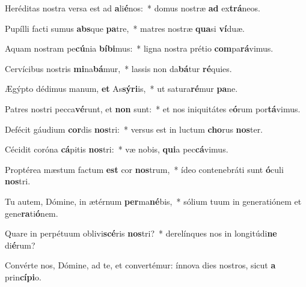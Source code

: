 \item Heréditas nostra versa est ad \textbf{a}li\textbf{é}nos:~* domus nostræ \textbf{ad} ex\textbf{trá}neos.
\item Pupílli facti sumus \textbf{abs}que \textbf{pa}tre,~* matres nostræ \textbf{qua}si \textbf{ví}duæ.
\item Aquam nostram pe\textbf{cú}nia \textbf{bí}\textbf{bi}mus:~* ligna nostra prétio \textbf{com}pa\textbf{rá}vimus.
\item Cervícibus nostris \textbf{mi}na\textbf{bá}mur,~* lassis non da\textbf{bá}tur \textbf{ré}quies.
\item Ægýpto dédimus manum, \textbf{et} As\textbf{sý}\textbf{ri}is,~* ut satura\textbf{ré}mur \textbf{pa}ne.
\item Patres nostri pecca\textbf{vé}runt, et \textbf{non} sunt:~* et nos iniquitátes e\textbf{ó}rum por\textbf{tá}vimus.
\item Defécit gáudium \textbf{cor}dis \textbf{nos}tri:~* versus est in luctum \textbf{cho}rus \textbf{nos}ter.
\item Cécidit coróna \textbf{cá}pitis \textbf{nos}tri:~* væ nobis, \textbf{qui}a pec\textbf{cá}vimus.
\item Proptérea mæstum factum \textbf{est} cor \textbf{nos}trum,~* ídeo contenebráti sunt \textbf{ó}culi \textbf{nos}tri.
\item Tu autem, Dómine, in ætérnum \textbf{per}ma\textbf{né}bis,~* sólium tuum in generatiónem et gene\textbf{ra}ti\textbf{ó}nem.
\item Quare in perpétuum oblivi\textbf{scé}ris \textbf{nos}tri?~* derelínques nos in longitúdi\textbf{ne} di\textbf{é}rum?
\item Convérte nos, Dómine, ad te, et convertémur: ínnova dies nostros, sicut \textbf{a} prin\textbf{cí}\textbf{pi}o.
